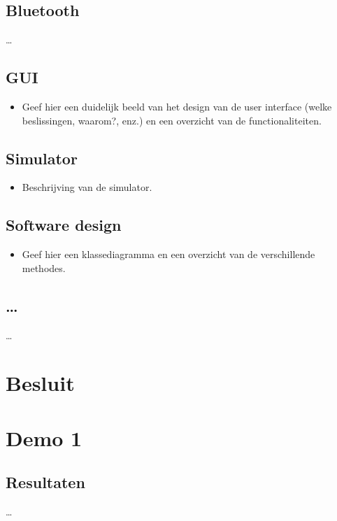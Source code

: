 \documentclass[tt2]{penoverslag}
\begin{document}
\subsection{Bluetooth}
\ldots

\subsection{GUI}
\begin{itemize}
\item Geef hier een duidelijk beeld van het design van de user interface (welke beslissingen, waarom?, enz.) en een overzicht van de functionaliteiten.
\end{itemize}

\subsection{Simulator}
\begin{itemize}
\item Beschrijving van de simulator.
\end{itemize}

\subsection{Software design}
\begin{itemize}
\item Geef hier een klassediagramma en een overzicht van de verschillende methodes.
\end{itemize}

\subsection{\ldots}
\ldots


\section{Besluit}
\lipsum[6-7]



\newpage
\makeappendix

\section{Demo 1}

\subsection{Resultaten}
\ldots
\end{document}
